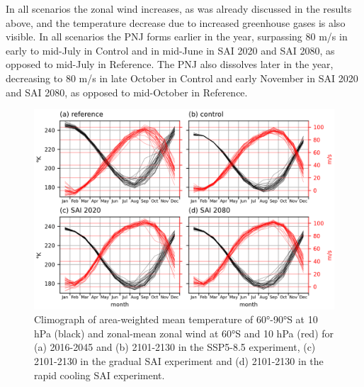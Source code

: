 In all scenarios the zonal wind increases, as was already discussed in the results above, and the temperature decrease due to increased greenhouse gases is also visible. In all scenarios the PNJ forms earlier in the year, surpassing 80 m/s in early to mid-July in Control and in mid-June in SAI 2020 and SAI 2080, as opposed to mid-July in Reference. The PNJ also dissolves later in the year, decreasing to 80 m/s in late October in Control and early November in SAI 2020 and SAI 2080, as opposed to mid-October in Reference.

\begin{figure}[H]
	\centering
	\includegraphics[width=0.95\linewidth]{images/PNJ_climographTU.png}
	\caption{Climograph of area-weighted mean temperature of 60°-90°S at 10 hPa (black) and zonal-mean zonal wind at 60°S and 10 hPa (red) for (a) 2016-2045 and (b) 2101-2130 in the SSP5-8.5 experiment, (c) 2101-2130 in the gradual SAI experiment and (d) 2101-2130 in the rapid cooling SAI experiment.}
	\label{fig:PNJ_climographTU}
\end{figure}